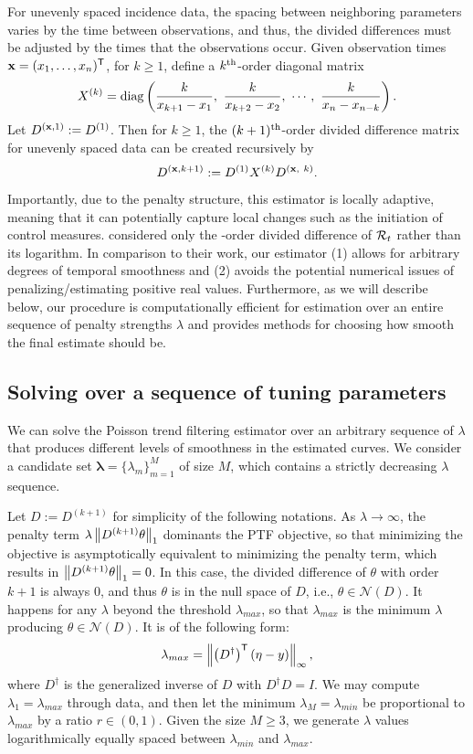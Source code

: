 For unevenly spaced incidence data, the spacing between neighboring parameters
varies by the time between observations, and thus, the divided differences must
be adjusted by the times that the observations occur.
Given observation times $\mathbf{x} = (x_1,\dots,x_n)^{\mathsf{T}}$, for $k \geq 1$, define a
$k^{\textnormal{th}}$-order diagonal matrix $$X^{(k)} = \diag \lr{\frac{k}{x_{k+1} - x_1},\ 
\frac{k}{x_{k+2} - x_2},\ \cdots,\ \frac{k}{x_n - x_{n-k}} }.$$ 
Let $D^{(\mathbf{x},1)} :=
D^{(1)}$. Then for $k\geq 1$, the $(k+1)^{\textnormal{th}}$-order divided difference matrix
for unevenly spaced data can be created recursively by
$$D^{(\bfx, k+1)} := D^{(1)} X^{(k)} D^{(\bfx,\ k)}.$$ 

Importantly, due to the penalty structure, this estimator is locally adaptive,
meaning that it can potentially capture local changes such as the initiation of
control measures. \cite{abry2020spatial,pascal2022nonsmooth} considered only the
\second-order divided difference of $\mathcal{R}_t$ rather than its logarithm. In
comparison to their work, our estimator (1) allows for arbitrary degrees of
temporal smoothness and (2) avoids the potential numerical issues of
penalizing/estimating positive real values. Furthermore, as we will describe
below, our procedure is computationally efficient for estimation over an entire
sequence of penalty strengths $\lambda$ and provides methods for choosing how
smooth the final estimate should be.


\subsection{Solving over a sequence of tuning parameters}
\label{sec:candidate-set}

We can solve the Poisson trend filtering estimator over an arbitrary sequence of 
$\lambda$ that produces different levels of smoothness in the estimated curves. 
We consider a candidate set $\boldsymbol{\lambda} = \{\lambda_m\}_{m=1}^M$ of 
size $M$, which contains a strictly decreasing $\lambda$ sequence.%

Let $D := D^{(k+1)}$ for simplicity of the following notations. 
As $\lambda \to\infty$, the penalty term $\lambda \left\lVert D^{(k+1)}\theta \right\rVert_1$ dominants 
the PTF objective, so that minimizing the objective is asymptotically equivalent to 
minimizing the penalty term, which results in $\left\lVert D^{(k+1)}\theta \right\rVert_1 = 0$. 
In this case, the divided difference of $\theta$ with order $k+1$ is always $0$, 
and thus $\theta$ is in the null space of $D$, i.e., $\theta\in\mathcal{N}(D)$. 
It happens for any $\lambda$ beyond the threshold $\lambda_{max}$, so that 
$\lambda_{max}$ is the minimum $\lambda$ producing $\theta\in\mathcal{N}(D)$. 
It is of the following form: $$\lambda_{max} = \left\lVert \left(D^{\dagger}\right)^{\mathsf{T}} \left(\eta - y\right) \right\rVert_{\infty},$$
where $D^{\dagger}$ is the generalized inverse of $D$ with $D^{\dagger} D = I$. 
We may compute $\lambda_1 = \lambda_{max}$ through data, and then let the minimum
$\lambda_M = \lambda_{min}$ be proportional to $\lambda_{max}$ by a ratio $r \in (0,1)$. 
Given the size $M\geq 3$, we generate $\lambda$ values logarithmically equally spaced between 
$\lambda_{min}$ and $\lambda_{max}$. 

